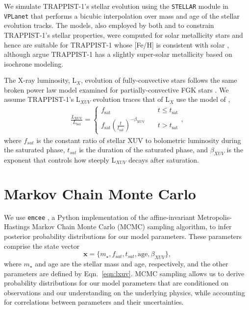 \documentclass[twocolumn]{aastex62}
\newcommand{\vplanet}[0]{\texttt{VPLanet}\xspace}
\newcommand{\stellar}[0]{\texttt{STELLAR}\xspace}
\begin{document}
We simulate TRAPPIST-1's stellar evolution using the \stellar module in \vplanet \citep{Barnes2019} that performs a bicubic interpolation over mass and age of the \citet{Baraffe2015} stellar evolution tracks. The \citet{Baraffe2015} models, also employed by both \citet{Burgasser2017} and \citet{vanGrootel2018} to constrain TRAPPIST-1's stellar properties, were computed for solar metallicity stars and hence are suitable for TRAPPIST-1 whose [Fe/H] is consistent with solar \citep{Gillon2016}, although \citet{Burgasser2017} argue TRAPPIST-1 has a slightly super-solar metallicity based on isochrone modeling.

The X-ray luminosity, L$_{X}$, evolution of fully-convective stars follows the same broken power law model examined for partially-convective FGK stars \citep{Wright2016,Wright2018}. We assume TRAPPIST-1's L$_{XUV}$ evolution traces that of L$_{X}$ use the model of \citet{Ribas2005},
\begin{align}
\label{eqn:lxuv}
\frac{L_\mathrm{XUV}}{L_\mathrm{bol}} = \left\{
				\begin{array}{lcr}
					f_\mathrm{sat} &\ & t \leq t_\mathrm{sat} \\
					f_\mathrm{sat}\left(\frac{t}{t_\mathrm{sat}}\right)^{-\beta_\mathrm{XUV}} &\ & t > t_\mathrm{sat}
				\end{array}
				\right.,
\end{align}
where $f_{sat}$ is the constant ratio of stellar XUV to bolometric luminosity during the saturated phase, $t_{sat}$ is the duration of the saturated phase, and $\beta_{XUV}$ is the exponent that controls how steeply L$_{XUV}$ decays after saturation.


\section{Markov Chain Monte Carlo} \label{sec:mcmc}

We use \texttt{emcee} \citep{ForemanMackey2013}, a Python implementation of the \citet{Goodman2010} affine-invariant Metropolis-Hastings Markov Chain Monte Carlo (MCMC) sampling algorithm, to infer posterior probability distributions for our model parameters. These parameters comprise the state vector
\begin{equation} \label{eqn:state}
    \textbf{x} = \{m_{\star}, f_{sat}, t_{sat}, \mathrm{age}, \beta_{XUV}\},
\end{equation}
where $m_{\star}$ and age are the stellar mass and age, respectively, and the other parameters are defined by Eqn.~\ref{eqn:lxuv}.  MCMC sampling allows us to derive probability distributions for our model parameters that are conditioned on observations and our understanding on the underlying physics, while accounting for correlations between parameters and their uncertainties.  
\end{document}

